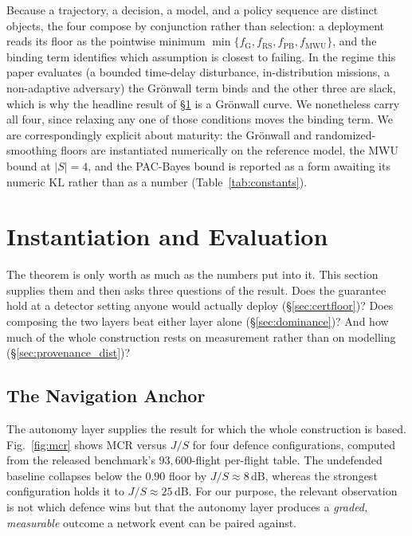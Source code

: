 Because a trajectory, a decision, a model, and a policy sequence are distinct
objects, the four compose by conjunction rather than selection: a deployment
reads its floor as the pointwise minimum
$\min\{f_{\mathrm{G}},f_{\mathrm{RS}},f_{\mathrm{PB}},f_{\mathrm{MWU}}\}$, and
the binding term identifies which assumption is closest to failing. In the
regime this paper evaluates (a bounded time-delay disturbance, in-distribution
missions, a non-adaptive adversary) the Gr\"onwall term binds and the other
three are slack, which is why the headline result of \S\ref{sec:eval} is a
Gr\"onwall curve. We nonetheless carry all four, since relaxing any one of those
conditions moves the binding term. We are correspondingly explicit about
maturity: the Gr\"onwall and randomized-smoothing floors are instantiated
numerically on the reference model, the MWU bound at $|S|=4$, and the PAC-Bayes
bound is reported as a form awaiting its numeric $\mathrm{KL}$ rather than as a
number (Table~\ref{tab:constants}).

\section{Instantiation and Evaluation}
\label{sec:eval}
The theorem is only worth as much as the numbers put into it. This section
supplies them and then asks three questions of the result. Does the guarantee
hold at a detector setting anyone would actually deploy
(\S\ref{sec:certfloor})? Does composing the two layers beat either layer alone
(\S\ref{sec:dominance})? And how much of the whole construction rests on
measurement rather than on modelling (\S\ref{sec:provenance_dist})?

\subsection{The Navigation Anchor}
The autonomy layer supplies the result for which the whole construction is based.
Fig.~\ref{fig:mcr} shows MCR versus $J/S$ for four defence configurations,
computed from the released benchmark's $93{,}600$-flight per-flight table. The
undefended baseline collapses below the $0.90$ floor by $J/S\!\approx\!8$\,dB,
whereas the strongest configuration holds it to $J/S\!\approx\!25$\,dB. For our
purpose, the relevant observation is not which defence wins but that the
autonomy layer produces
a \emph{graded, measurable} outcome a network event can be paired against.

